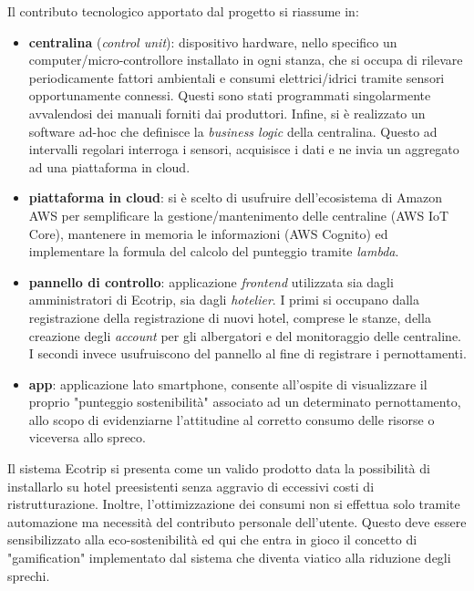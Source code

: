 Il contributo tecnologico apportato dal progetto si riassume in:
\begin{itemize}
    \item \textbf{centralina} (\textit{control unit}): dispositivo hardware, nello specifico un computer/micro-controllore installato in ogni stanza, che si occupa di rilevare periodicamente fattori ambientali e consumi elettrici/idrici tramite sensori opportunamente connessi. Questi sono stati programmati singolarmente avvalendosi dei manuali forniti dai produttori. Infine, si è realizzato un software ad-hoc che definisce la \textit{business logic} della centralina. Questo ad intervalli regolari interroga i sensori, acquisisce i dati e ne invia un aggregato ad una piattaforma in cloud. 
    \item \textbf{piattaforma in cloud}: si è scelto di usufruire dell'ecosistema di Amazon AWS per semplificare la gestione/mantenimento delle centraline (AWS IoT Core), mantenere in memoria le informazioni (AWS Cognito) ed implementare la formula del calcolo del punteggio tramite \textit{lambda}.
    \item \textbf{pannello di controllo}: applicazione \textit{frontend} utilizzata sia dagli amministratori di Ecotrip, sia dagli \textit{hotelier}. I primi si occupano dalla registrazione della registrazione di nuovi hotel, comprese le stanze, della creazione degli \textit{account} per gli albergatori e del monitoraggio delle centraline. I secondi invece usufruiscono del pannello al fine di registrare i pernottamenti.
    \item \textbf{app}: applicazione lato smartphone, consente all'ospite di visualizzare il proprio "punteggio sostenibilità" associato ad un determinato pernottamento, allo scopo di evidenziarne l'attitudine al corretto consumo delle risorse o viceversa allo spreco.
\end{itemize}
Il sistema Ecotrip si presenta come un valido prodotto data la possibilità di installarlo su hotel preesistenti senza aggravio di eccessivi costi di ristrutturazione. Inoltre, l'ottimizzazione dei consumi non si effettua solo tramite automazione ma necessità del contributo personale dell'utente. Questo deve essere sensibilizzato alla eco-sostenibilità ed qui che entra in gioco il concetto di "gamification" implementato dal sistema che diventa viatico alla riduzione degli sprechi.

\newpage